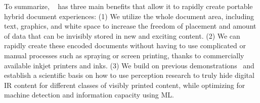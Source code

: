 \vspace{0.2cm}
To summarize, %
\systemName~ has three main benefits that allow it to rapidly create portable %
hybrid document experiences:
(1) We utilize the whole document area, including text, graphics, and white space to increase the freedom of placement and amount of data that can be invisibly stored in new and exciting content. %
(2) We can rapidly create these encoded documents without having to use complicated or manual processes such as spraying or screen printing, thanks to commercially available inkjet printers and inks.
(3) We build on previous demonstrations~\cite{dogan_standarone_2023} and establish a scientific basis on how to use perception research to truly hide digital IR content for different classes of visibly printed content, while optimizing for machine detection and information capacity using ML.

